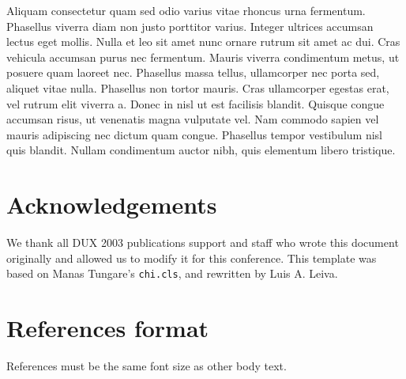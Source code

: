 \documentclass{chi-ext}
\begin{document}
Aliquam consectetur quam sed odio varius vitae rhoncus urna fermentum. Phasellus viverra diam non justo porttitor varius. Integer ultrices accumsan lectus eget mollis. Nulla et leo sit amet nunc ornare rutrum sit amet ac dui. Cras vehicula accumsan purus nec fermentum. Mauris viverra condimentum metus, ut posuere quam laoreet nec. Phasellus massa tellus, ullamcorper nec porta sed, aliquet vitae nulla. Phasellus non tortor mauris. Cras ullamcorper egestas erat, vel rutrum elit viverra a. Donec in nisl ut est facilisis blandit. Quisque congue accumsan risus, ut venenatis magna vulputate vel. Nam commodo sapien vel mauris adipiscing nec dictum quam congue. Phasellus tempor vestibulum nisl quis blandit. Nullam condimentum auctor nibh, quis elementum libero tristique.



\section{Acknowledgements}
We thank all DUX 2003 publications support and staff who wrote this document originally and allowed us to modify it for this conference.
This template was based on Manas Tungare's \texttt{chi.cls}, and rewritten by Luis A. Leiva.

\section{References format}
References must be the same font size as other body text.

\balance


\end{document}
